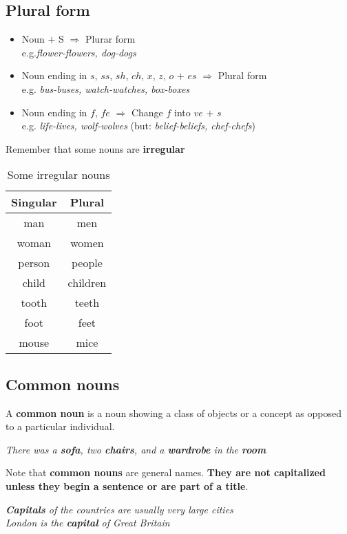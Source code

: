 \documentclass[10pt,a4paper]{article}
\begin{document}
\subsection{Plural form}
\begin{itemize}
		\item Noun $+$ S $\Rightarrow$ Plurar form \\e.g.\textit{flower-flowers, dog-dogs}
		\item Noun ending in $s$, $ss$, $sh$, $ch$, $x$, $z$, $o$ $+$ $es$ $\Rightarrow$ Plural form \\ e.g. \textit{ bus-buses, watch-watches, box-boxes}
		\item Noun ending in $f$, $fe$ $\Rightarrow$ Change $f$ into $ve$ $+$ $s$ \\e.g. \textit{life-lives, wolf-wolves} \quad (but: \textit{belief-beliefs, chef-chefs})
\end{itemize}
Remember that some nouns are \textbf{irregular}\\
\begin{table}[h]
\begin{center}
\begin{tabular}{|c|c|}
\hline
\textbf{Singular} & \textbf{Plural}\\
\hline
man & men\\ \hline
woman & women\\\hline
person & people\\\hline
child & children\\\hline
tooth & teeth\\\hline
foot & feet\\\hline
mouse & mice\\
\hline
\end{tabular}
\end{center}
\caption{\label{tab:nouns1}Some irregular nouns}
\end{table}


\subsection{Common nouns}
A \textbf{common noun} is a noun showing a class of objects or a concept as opposed to a particular individual.\\
\begin{center}
\textit{
There was a \textbf{sofa}, two \textbf{chairs}, and a \textbf{wardrobe} in the \textbf{room}}
\end{center}
\indent
Note that \textbf{common nouns} are general names. \textbf{They are not capitalized unless they begin a sentence or are part of a title}.
\begin{center}
		\textit{
		\textbf{Capitals} of the countries are usually very large cities\\
London is the \textbf{capital} of Great Britain}
\end{center}
\end{document}
